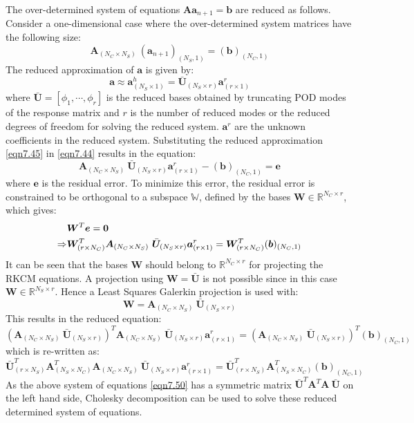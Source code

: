 \documentclass[10pt,letterpaper, onecolumn]{article}
\begin{document}
The over-determined system of equations $\bm{A} \bm{a}_{n+1} = \bm{b}$ are reduced as follows. Consider a one-dimensional case where the over-determined system matrices have the following size:
%
\begin{equation}
\bm{A}_{(N_C \times N_S)} \ (\bm{a}_{n+1})_{(N_S,1)} = (\bm{b})_{(N_C,1)}
\label{eqn7.44}
\end{equation}
%
 The reduced approximation of $\bm{a}$ is given by:
%
\begin{equation}
\bm{a} \approx \bm{a}^h_{(N_S \times 1)}  = \bar{\bm{U}}_{(N_S \times r)}  \bm{a}^r_{(r \times 1)}
\label{eqn7.45}
\end{equation}
%
where $\bar{\bm{U}} = [\phi_1, \cdots, \phi_r]$ is the reduced bases obtained by truncating POD modes of the response matrix and $r$ is the number of reduced modes or the reduced degrees of freedom for solving the reduced system. $ \bm{a}^r$ are the unknown coefficients in the reduced system. Substituting the reduced approximation \eqref{eqn7.45} in \eqref{eqn7.44} results in the equation: 
%
\begin{equation}
\bm{A}_{(N_C \times N_S)} \ \bar{\bm{U}}_{(N_S \times r)}  \bm{a}^r_{(r \times 1)} - (\bm{b})_{(N_C,1)} = \bm{e}
\end{equation}
%
where $\bm{e}$ is the residual error. To minimize this error, the residual error is constrained to be orthogonal to a subspace $\mathbb{W}$, defined by the bases $\bm{W} \in \mathbb{R}^{N_C \times r}$, which gives:
%
\begin{align}
&\bm{W}^T \bm{e} = \bm{0} \notag \\
\Rightarrow &\bm{W}^T_{(r \times N_C)} \bm{A}_{(N_C \times N_S)} \ \bar{\bm{U}}_{(N_S \times r)}  \bm{a}^r_{(r \times 1)} = \bm{W}^T_{(r \times N_C)} (\bm{b})_{(N_C,1)} 
\end{align}
%
It can be seen that the bases $\bm{W}$ should belong to $\mathbb{R}^{N_C \times r}$ for projecting the RKCM equations. A projection using $\bm{W} = \bm{\bar{U}}$ is not possible since in this case $\bm{W} \in \mathbb{R}^{N_S \times r}$. Hence a Least Squares Galerkin projection is used with: 
%
\begin{equation}
\bm{W} = \bm{A}_{(N_C \times N_S)} \ \bar{\bm{U}}_{(N_S \times r)}
\end{equation}
% 
This results in the reduced equation:
%
\begin{equation}
(\bm{A}_{(N_C \times N_S)} \ \bar{\bm{U}}_{(N_S \times r)})^T \bm{A}_{(N_C \times N_S)} \ \bar{\bm{U}}_{(N_S \times r)}  \bm{a}^r_{(r \times 1)} = (\bm{A}_{(N_C \times N_S)} \ \bar{\bm{U}}_{(N_S \times r)})^T (\bm{b})_{(N_C,1)} 
\end{equation}
%
which is re-written as:
%
\begin{equation}
\bar{\bm{U}}^T_{(r \times N_S)} \bm{A}^T_{(N_S \times N_C)} 
\bm{A}_{(N_C \times N_S)} \ \bar{\bm{U}}_{(N_S \times r)}  \bm{a}^r_{(r \times 1)} 
=  \bar{\bm{U}}^T_{(r \times N_S)} \bm{A}^T_{(N_S \times N_C)}  (\bm{b})_{(N_C,1)} 
\label{eqn7.50}
\end{equation}
%
As the above system of equations \eqref{eqn7.50} has a symmetric matrix $\bar{\bm{U}}^T \bm{A}^T 
\bm{A} \ \bar{\bm{U}}$ on the left hand side, Cholesky decomposition can be used to solve these reduced determined system of equations.
\end{document}
